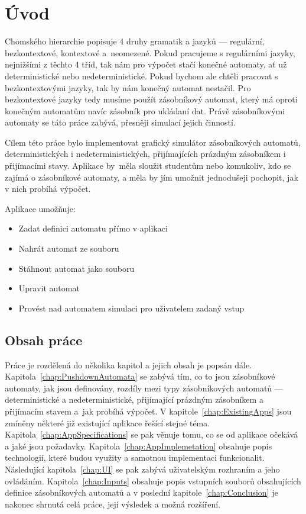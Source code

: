 \chapter{Úvod}    
Chomského hierarchie popisuje 4 druhy gramatik a jazyků --- regulární, bezkontextové, kontextové a~neomezené. Pokud pracujeme s regulárními jazyky, nejnižšími z těchto 4 tříd, tak nám pro výpočet stačí konečné automaty, ať už deterministické nebo nedeterministické. Pokud bychom ale chtěli pracovat s bezkontextovými jazyky, tak by nám konečný automat nestačil. Pro bezkontextové jazyky tedy musíme použít zásobníkový automat, který má oproti konečným automatům navíc zásobník pro ukládaní dat. Právě zásobníkovými automaty se táto práce zabývá, přesněji simulací jejich činností.

Cílem této práce bylo implementovat grafický simulátor zásobníkových automatů, deterministických i nedeterministických, přijímajících prázdným zásobníkem i přijímacími stavy. Aplikace by~měla sloužit studentům nebo komukoliv, kdo se zajímá o zásobníkové automaty, a měla by jím umožnit jednodušeji pochopit, jak v nich probíhá výpočet.

Aplikace umožňuje:
\begin{itemize}
    \item Zadat definici automatu přímo v aplikaci
    \item Nahrát automat ze souboru
    \item Stáhnout automat jako souboru
    \item Upravit automat
    \item Provést nad automatem simulaci pro uživatelem zadaný vstup
\end{itemize}

\section{Obsah práce}

Práce je rozdělená do několika kapitol a jejich obsah je popsán dále. Kapitola~\ref{chap:PushdownAutomata} se zabývá tím, co to jsou zásobníkové automaty, jak jsou definovány, rozdíly mezi typy zásobníkových automatů --- deterministické a nedeterministické, přijímající prázdným zásobníkem a přijímacím stavem a~jak probíhá výpočet. V kapitole~\ref{chap:ExistingApps} jsou zmíněny některé již existující aplikace řešící stejné téma. Kapitola~\ref{chap:AppSpecifications} se pak věnuje tomu, co se od aplikace očekává a jaké jsou požadavky. Kapitola~\ref{chap:AppImplemetation} obsahuje popis technologií, které budou využity a samotnou implementaci funkcionalit. Následující kapitola~\ref{chap:UI} se pak zabývá uživatelským rozhraním a jeho ovládáním. Kapitola~\ref{chap:Inputs} obsahuje popis vstupních souborů obsahujících definice zásobníkových automatů a v poslední kapitole~\ref{chap:Conclusion} je nakonec shrnutá celá práce, její výsledek a možná rozšíření.
\endinput